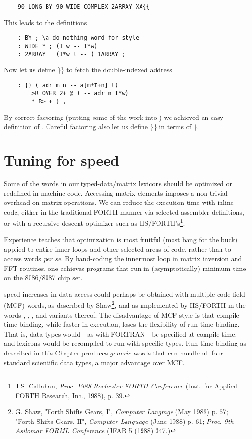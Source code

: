 \begin{lstlisting}
    90 LONG BY 90 WIDE COMPLEX 2ARRAY XA{{
\end{lstlisting}

This leads to the definitions
\begin{lstlisting}
    : BY ; \a do-nothing word for style
    : WIDE * ; (I w -- I*w)
    : 2ARRAY   (I*w t -- ) 1ARRAY ;
\end{lstlisting}

Now let us define \}\} to fetch the double-indexed address:

\begin{lstlisting}
    : }} ( adr m n -- a[m*I+n] t)
        >R OVER 2+ @ ( -- adr m I*w)
        * R> + } ;
\end{lstlisting}

By correct factoring (putting some of the work into ) we achieved an easy definition of . Careful factoring also let
us define \}\} in terms of \}.

\section{Tuning for speed}

Some of the words in our typed-data/matrix lexicons should be optimized or redefined in machine code. Accessing matrix elements imposes a non-trivial overhead on matrix operations. We can reduce the execution time with inline code, either in the traditional FORTH manner via selected assembler definitions, or with a recursive-descent optimizer such as HS/FORTH's\footnote{J.S. Callahan, \textit{Proc. 1988 Rochester FORTH Conference} (Inst. for Applied FORTH Research, Inc., 1988), p. 39.}.

Experience teaches that optimization is most fruitful (most bang for the buck) applied to entire inner loops and other selected areas of code, rather than to access words \textit{per se}. By hand-coding the innermost loop in matrix inversion and FFT routines, one achieves programs that run in (asymptotically) minimum time on the 8086/8087 chip set.

 speed increases in data access could perhaps be obtained with multiple code field (MCF) words, as described by Shaw\footnote{G. Shaw, "Forth Shifts Gears, I", \textit{Computer Langmge} (May 1988) p. 67; "Forth Shifts Gears, II", \textit{Computer Language} (June 1988) p. 61; \textit{Proc. 9th Asilomar FORML Conference} (JFAR 5 (1988) 347.)}, and as implemented by HS/FORTH in the words , , , and variants thereof. The disadvantage of MCF style is that compile-time binding, while faster in execution, loses the flexibility of run-time binding. That is, data types would - as with FORTRAN - be specified at compile-time, and lexicons would be recompiled to run with specific types. Run-time binding as described in this Chapter produces \textit{generic} words that can handle all four standard scientific data types, a major advantage over MCF.

